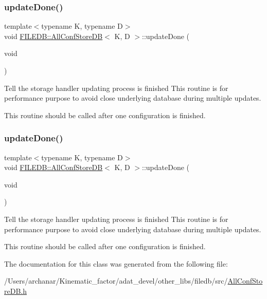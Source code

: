 \subsubsection{\texorpdfstring{updateDone()}{updateDone()}\hspace{0.1cm}{\footnotesize\ttfamily [1/2]}}
{\footnotesize\ttfamily template$<$typename K, typename D$>$ \\
void \mbox{\hyperlink{classFILEDB_1_1AllConfStoreDB}{F\+I\+L\+E\+D\+B\+::\+All\+Conf\+Store\+DB}}$<$ K, D $>$\+::update\+Done (\begin{DoxyParamCaption}\item[{void}]{ }\end{DoxyParamCaption})\hspace{0.3cm}{\ttfamily [inline]}}

Tell the storage handler updating process is finished This routine is for performance purpose to avoid close underlying database during multiple updates.

This routine should be called after one configuration is finished. \mbox{\label{classFILEDB_1_1AllConfStoreDB_ac90e596f6c914145130719ec5ac13593}} 
\subsubsection{\texorpdfstring{updateDone()}{updateDone()}\hspace{0.1cm}{\footnotesize\ttfamily [2/2]}}
{\footnotesize\ttfamily template$<$typename K, typename D$>$ \\
void \mbox{\hyperlink{classFILEDB_1_1AllConfStoreDB}{F\+I\+L\+E\+D\+B\+::\+All\+Conf\+Store\+DB}}$<$ K, D $>$\+::update\+Done (\begin{DoxyParamCaption}\item[{void}]{ }\end{DoxyParamCaption})\hspace{0.3cm}{\ttfamily [inline]}}

Tell the storage handler updating process is finished This routine is for performance purpose to avoid close underlying database during multiple updates.

This routine should be called after one configuration is finished. 

The documentation for this class was generated from the following file\+:\begin{DoxyCompactItemize}
\item 
/\+Users/archanar/\+Kinematic\+\_\+factor/adat\+\_\+devel/other\+\_\+libs/filedb/src/\mbox{\hyperlink{other__libs_2filedb_2src_2AllConfStoreDB_8h}{All\+Conf\+Store\+D\+B.\+h}}\end{DoxyCompactItemize}
